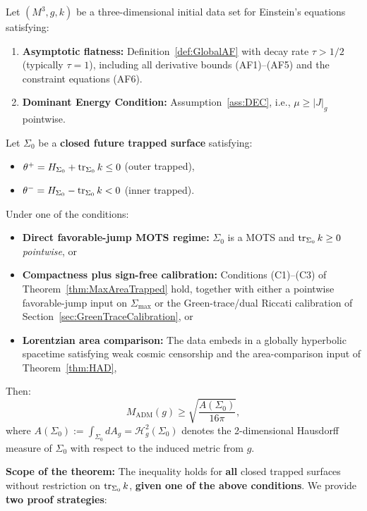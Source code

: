 \begin{theorem}\label{thm:MainTheorem}
Let $(M^3, g, k)$ be a three-dimensional initial data set for Einstein's equations satisfying:
\begin{enumerate}
    \item[\textup{(AF)}] \textbf{Asymptotic flatness:} Definition~\ref{def:GlobalAF} with decay rate $\tau > 1/2$ (typically $\tau=1$), including all derivative bounds (AF1)--(AF5) and the constraint equations (AF6).
    \item[\textup{(DEC)}] \textbf{Dominant Energy Condition:} Assumption~\ref{ass:DEC}, i.e., $\mu \ge |J|_g$ pointwise.
\end{enumerate}
Let $\Sigma_0$ be a \textbf{closed future trapped surface} satisfying:
\begin{itemize}
    \item $\theta^+ = H_{\Sigma_0} + \operatorname{tr}_{\Sigma_0} k \le 0$ \quad (outer trapped),
    \item $\theta^- = H_{\Sigma_0} - \operatorname{tr}_{\Sigma_0} k < 0$ \quad (inner trapped).
\end{itemize}
Under one of the conditions:
\begin{itemize}
    \item[(A)] \textbf{Direct favorable-jump MOTS regime:} $\Sigma_0$ is a MOTS and $\operatorname{tr}_{\Sigma_0} k \ge 0$ \emph{pointwise}, or
    \item[(B)] \textbf{Compactness plus sign-free calibration:} Conditions (C1)--(C3) of Theorem~\ref{thm:MaxAreaTrapped} hold, together with either a pointwise favorable-jump input on \(\Sigma_{\max}\) or the Green-trace/dual Riccati calibration of Section~\ref{sec:GreenTraceCalibration}, or
    \item[(C)] \textbf{Lorentzian area comparison:} The data embeds in a globally hyperbolic spacetime satisfying weak cosmic censorship and the area-comparison input of Theorem~\ref{thm:HAD},
\end{itemize}
Then:
\begin{equation}
    \boxed{M_{\mathrm{ADM}}(g) \ge \sqrt{\frac{A(\Sigma_0)}{16\pi}},}
\end{equation}
where $A(\Sigma_0) := \int_{\Sigma_0} dA_g = \mathcal{H}^2_g(\Sigma_0)$ denotes the 2-dimensional Hausdorff measure of $\Sigma_0$ with respect to the induced metric from $g$.

\textbf{Scope of the theorem:} The inequality holds for \textbf{all} closed trapped surfaces without restriction on $\operatorname{tr}_{\Sigma_0} k$, \textbf{given one of the above conditions}. We provide \textbf{two proof strategies}:


\end{theorem}
